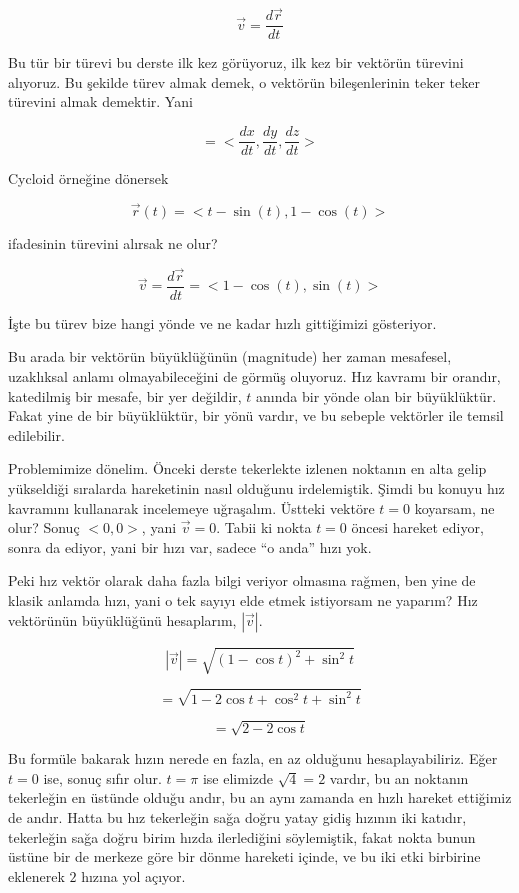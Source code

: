 \documentclass[12pt,fleqn]{article}\usepackage{../../common}
\begin{document}
$$ \vec{v} = \frac{d\vec{r}}{dt} $$

Bu tür bir türevi bu derste ilk kez görüyoruz, ilk kez bir vektörün
türevini alıyoruz. Bu şekilde türev almak demek, o vektörün bileşenlerinin
teker teker türevini almak demektir. Yani

$$ =
<\frac{dx}{dt}, \frac{dy}{dt}, \frac{dz}{dt}>
$$

Cycloid örneğine dönersek

$$ \vec{r}(t) = < t-\sin(t), 1-\cos(t) >$$

ifadesinin türevini alırsak ne olur? 

$$ \vec{v} = \frac{d\vec{r}}{dt} = < 1-\cos(t),\sin(t) >$$

İşte bu türev bize hangi yönde ve ne kadar hızlı gittiğimizi gösteriyor. 

Bu arada bir vektörün büyüklüğünün (magnitude) her zaman mesafesel, uzaklıksal
anlamı olmayabileceğini de görmüş oluyoruz. Hız kavramı bir orandır, katedilmiş
bir mesafe, bir yer değildir, $t$ anında bir yönde olan bir büyüklüktür. Fakat
yine de bir büyüklüktür, bir yönü vardır, ve bu sebeple vektörler ile temsil
edilebilir.

Problemimize dönelim. Önceki derste tekerlekte izlenen noktanın en alta gelip
yükseldiği sıralarda hareketinin nasıl olduğunu irdelemiştik. Şimdi bu konuyu
hız kavramını kullanarak incelemeye uğraşalım. Üstteki vektöre $t=0$ koyarsam,
ne olur? Sonuç $< 0,0 >$, yani $\vec{v} = 0$. Tabii ki nokta $t=0$ öncesi hareket
ediyor, sonra da ediyor, yani bir hızı var, sadece ``o anda'' hızı yok.

Peki hız vektör olarak daha fazla bilgi veriyor olmasına rağmen, ben yine de
klasik anlamda hızı, yani o tek sayıyı elde etmek istiyorsam ne yaparım?  Hız
vektörünün büyüklüğünü hesaplarım, $|\vec{v}|$.

$$ |\vec{v}| = \sqrt{ (1-\cos t)^2 + \sin^2t } $$

$$ = \sqrt{ 1-2\cos t + \cos^2t + \sin^2t } $$

$$ = \sqrt{ 2-2\cos t } $$

Bu formüle bakarak hızın nerede en fazla, en az olduğunu hesaplayabiliriz. Eğer
$t=0$ ise, sonuç sıfır olur. $t=\pi$ ise elimizde $\sqrt{4} = 2$ vardır, bu an
noktanın tekerleğin en üstünde olduğu andır, bu an aynı zamanda en hızlı hareket
ettiğimiz de andır. Hatta bu hız tekerleğin sağa doğru yatay gidiş hızının iki
katıdır, tekerleğin sağa doğru birim hızda ilerlediğini söylemiştik, fakat nokta
bunun üstüne bir de merkeze göre bir dönme hareketi içinde, ve bu iki etki
birbirine eklenerek $2$ hızına yol açıyor.
\end{document}
